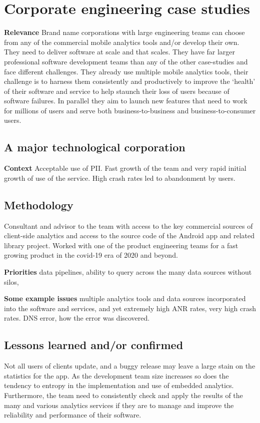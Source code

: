 \section{Corporate engineering case studies}
\label{section-corporate-engineering-case-studies}
\textbf{Relevance}
Brand name corporations with large engineering teams can choose from any of the commercial mobile analytics tools and/or develop their own. They need to deliver software at scale and that scales. They have far larger professional software development teams than any of the other case-studies and face different challenges. They already use multiple mobile analytics tools, their challenge is to harness them consistently and productively to improve the `health' of their software and service to help staunch their loss of users because of software failures. In parallel they aim to launch new features that need to work for millions of users and serve both business-to-business and business-to-consumer users.


\subsection{A major technological corporation}
\textbf{Context} Acceptable use of PII. Fast growth of the team and very rapid initial growth of use of the service. High crash rates led to abandonment by users. 



\subsection{Methodology}
Consultant and advisor to the team with access to the key commercial sources of client-side analytics and access to the source code of the Android app and related library project. Worked with one of the product engineering teams for a fast growing product in the covid-19 era of 2020 and beyond.

\textbf{Priorities} data pipelines, ability to query across the many data sources without silos, 

\textbf{Some example issues} multiple analytics tools and data sources incorporated into the software and services, and yet extremely high ANR rates, very high crash rates. DNS error, how the error was discovered. 

\subsection{Lessons learned and/or confirmed}
Not all users of clients update, and a buggy release may leave a large stain on the statistics for the app. As the development team size increases so does the tendency to entropy in the implementation and use of embedded analytics. Furthermore, the team need to consistently check and apply the results of the many and various analytics services if they are to manage and improve the reliability and performance of their software.

